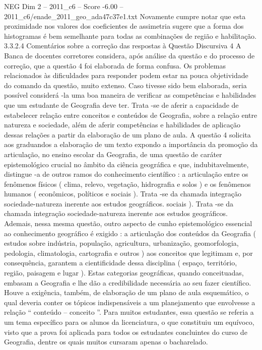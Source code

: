 \begin{textsample}{NEG Dim 2 – 2011\_c6 – Score -6.00 – 2011\_c6/enade\_2011\_geo\_ada47c37e1.txt}
Novamente cumpre notar que esta proximidade nos valores dos coeficientes de assimetria sugere que a forma dos histogramas é bem semelhante para todas as combinações de região e habilitação. 3.3.2.4 Comentários sobre a correção das respostas à Questão Discursiva 4 A Banca de docentes corretores considera, após análise da questão e do processo de correção, que a questão 4 foi elaborada de forma confusa.
Os problemas relacionados às dificuldades para responder podem estar na pouca objetividade do comando da questão, muito extenso.
Caso tivesse sido bem elaborada, seria possível considerá -la uma boa maneira de verificar as competências e habilidades que um estudante de Geografia deve ter.
Trata -se de aferir a capacidade de estabelecer relação entre conceitos e conteúdos de Geografia, sobre a relação entre natureza e sociedade, além de aferir competências e habilidades de aplicação dessas relações a partir da elaboração de um plano de aula.
A questão 4 solicita aos graduandos a elaboração de um texto expondo a importância da promoção da articulação, no ensino escolar da Geografia, de uma questão de caráter epistemológico crucial no âmbito da ciência geográfica e que, indubitavelmente, distingue -a de outros ramos do conhecimento científico : a articulação entre os fenômenos físicos ( clima, relevo, vegetação, hidrografia e solos ) e os fenômenos humanos ( econômicos, políticos e sociais ).
Trata -se da chamada integração sociedade-natureza inerente aos estudos geográficos. sociais ).
Trata -se da chamada integração sociedade-natureza inerente aos estudos geográficos.
Ademais, nessa mesma questão, outro aspecto de cunho epistemológico essencial ao conhecimento geográfico é exigido : a articulação dos conteúdos da Geografia ( estudos sobre indústria, população, agricultura, urbanização, geomorfologia, pedologia, climatologia, cartografia e outros ) aos conceitos que legitimam e, por consequência, garantem a cientificidade dessa disciplina ( espaço, território, região, paisagem e lugar ).
Estas categorias geográficas, quando conceituadas, embasam a Geografia e lhe dão a credibilidade necessária ao seu fazer científico.
Houve a exigência, também, de elaboração de um plano de aula esquemático, o qual deveria conter os tópicos indispensáveis a um planejamento que envolvesse a relação “ conteúdo – conceito ”.
Para muitos estudantes, essa questão se referia a um tema específico para os alunos da licenciatura, o que constituiu um equívoco, visto que a prova foi aplicada para todos os estudantes concluintes do curso de Geografia, dentre os quais muitos cursaram apenas o bacharelado.

\end{textsample}
